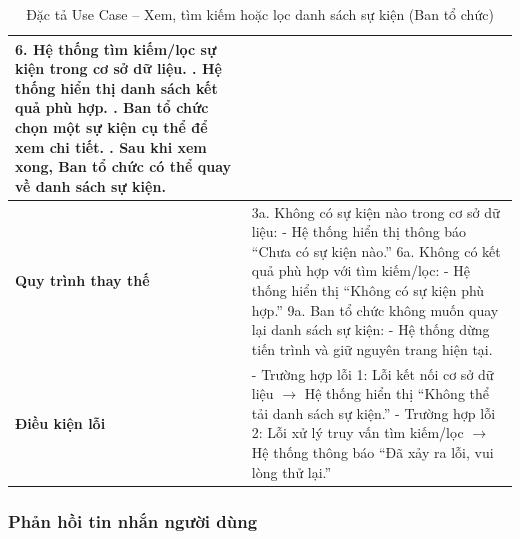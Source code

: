 \begin{table}[H]
\begin{tabularx}{\textwidth}{|l|X|}
6. Hệ thống tìm kiếm/lọc sự kiện trong cơ sở dữ liệu. \newline
7. Hệ thống hiển thị danh sách kết quả phù hợp. \newline
8. Ban tổ chức chọn một sự kiện cụ thể để xem chi tiết. \newline
9. Sau khi xem xong, Ban tổ chức có thể quay về danh sách sự kiện. \\ \hline
\textbf{Quy trình thay thế} &
3a. Không có sự kiện nào trong cơ sở dữ liệu: \newline
\hspace*{1em}- Hệ thống hiển thị thông báo “Chưa có sự kiện nào.” \newline
6a. Không có kết quả phù hợp với tìm kiếm/lọc: \newline
\hspace*{1em}- Hệ thống hiển thị “Không có sự kiện phù hợp.” \newline
9a. Ban tổ chức không muốn quay lại danh sách sự kiện: \newline
\hspace*{1em}- Hệ thống dừng tiến trình và giữ nguyên trang hiện tại. \\ \hline
\textbf{Điều kiện lỗi} &
- Trường hợp lỗi 1: Lỗi kết nối cơ sở dữ liệu $\rightarrow$ Hệ thống hiển thị “Không thể tải danh sách sự kiện.” \newline
- Trường hợp lỗi 2: Lỗi xử lý truy vấn tìm kiếm/lọc $\rightarrow$ Hệ thống thông báo “Đã xảy ra lỗi, vui lòng thử lại.” \\ \hline
\end{tabularx}
\vspace{15pt}
\caption{Đặc tả Use Case -- Xem, tìm kiếm hoặc lọc danh sách sự kiện (Ban tổ chức)}
\label{tab:uc_view_search_event}
\end{table}

\subsubsection{Phản hồi tin nhắn người dùng}


